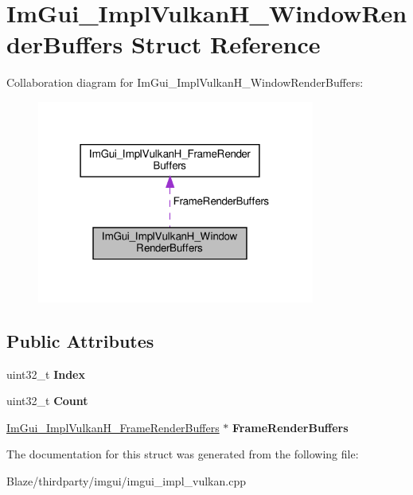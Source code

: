 \hypertarget{structImGui__ImplVulkanH__WindowRenderBuffers}{}\section{Im\+Gui\+\_\+\+Impl\+Vulkan\+H\+\_\+\+Window\+Render\+Buffers Struct Reference}
\label{structImGui__ImplVulkanH__WindowRenderBuffers}


Collaboration diagram for Im\+Gui\+\_\+\+Impl\+Vulkan\+H\+\_\+\+Window\+Render\+Buffers\+:\nopagebreak
\begin{figure}[H]
\begin{center}
\leavevmode
\includegraphics[width=259pt]{structImGui__ImplVulkanH__WindowRenderBuffers__coll__graph}
\end{center}
\end{figure}
\subsection*{Public Attributes}
\begin{DoxyCompactItemize}
\item 
\mbox{\label{structImGui__ImplVulkanH__WindowRenderBuffers_a10d4ec00475301f023e408c9bc22c90c}} 
uint32\+\_\+t {\bfseries Index}
\item 
\mbox{\label{structImGui__ImplVulkanH__WindowRenderBuffers_a87bd54bdf4cc2833beb02d305e536612}} 
uint32\+\_\+t {\bfseries Count}
\item 
\mbox{\label{structImGui__ImplVulkanH__WindowRenderBuffers_a43dbc34580f58a03750e2300c2002e97}} 
\hyperlink{structImGui__ImplVulkanH__FrameRenderBuffers}{Im\+Gui\+\_\+\+Impl\+Vulkan\+H\+\_\+\+Frame\+Render\+Buffers} $\ast$ {\bfseries Frame\+Render\+Buffers}
\end{DoxyCompactItemize}


The documentation for this struct was generated from the following file\+:\begin{DoxyCompactItemize}
\item 
Blaze/thirdparty/imgui/imgui\+\_\+impl\+\_\+vulkan.\+cpp\end{DoxyCompactItemize}
